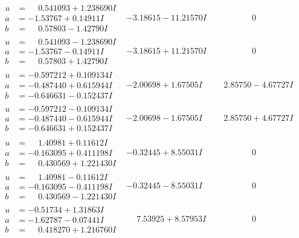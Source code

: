 \documentclass[1p]{elsarticle_modified}
\theoremstyle{definition}
\begin{document}
$$\begin{array}{c|c|c}
\begin{aligned}
u &= \phantom{-}0.541093 + 1.238690 I \\
a &= -1.53767 + 0.14911 I \\
b &= \phantom{-}0.57803 - 1.42790 I\end{aligned}
 & -3.18615 - 11.21570 I & \phantom{-0.000000 } 0 \\ \hline\begin{aligned}
u &= \phantom{-}0.541093 - 1.238690 I \\
a &= -1.53767 - 0.14911 I \\
b &= \phantom{-}0.57803 + 1.42790 I\end{aligned}
 & -3.18615 + 11.21570 I & \phantom{-0.000000 } 0 \\ \hline\begin{aligned}
u &= -0.597212 + 0.109134 I \\
a &= -0.487440 + 0.615944 I \\
b &= -0.646631 - 0.152437 I\end{aligned}
 & -2.00698 + 1.67505 I & \phantom{-}2.85750 - 4.67727 I \\ \hline\begin{aligned}
u &= -0.597212 - 0.109134 I \\
a &= -0.487440 - 0.615944 I \\
b &= -0.646631 + 0.152437 I\end{aligned}
 & -2.00698 - 1.67505 I & \phantom{-}2.85750 + 4.67727 I \\ \hline\begin{aligned}
u &= \phantom{-}1.40981 + 0.11612 I \\
a &= -0.163095 + 0.411198 I \\
b &= \phantom{-}0.430569 + 1.221430 I\end{aligned}
 & -0.32445 + 8.55031 I & \phantom{-0.000000 } 0 \\ \hline\begin{aligned}
u &= \phantom{-}1.40981 - 0.11612 I \\
a &= -0.163095 - 0.411198 I \\
b &= \phantom{-}0.430569 - 1.221430 I\end{aligned}
 & -0.32445 - 8.55031 I & \phantom{-0.000000 } 0 \\ \hline\begin{aligned}
u &= -0.51734 + 1.31863 I \\
a &= -1.62787 - 0.07441 I \\
b &= \phantom{-}0.418270 + 1.216760 I\end{aligned}
 & \phantom{-}7.53925 + 8.57953 I & \phantom{-0.000000 } 0\\

\end{array}$$
\end{document}
